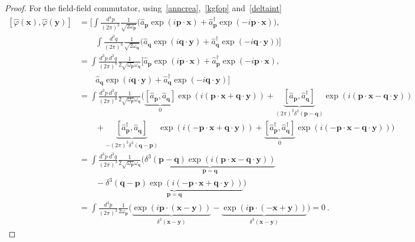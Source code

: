     \begin{proof}
        For the field-field commutator, using~\eqref{anncrea},~\eqref{kgfop} and~\eqref{deltaint}
        \begin{equation*}
        \begin{aligned}
            [\hat \varphi(\mathbf x), \hat \varphi (\mathbf y)] & = [\int \frac{d^3 p}{{(2\pi)}^3} \frac{1}{\sqrt{2 \omega_{\mathbf p}}} \Big (\hat a_{\mathbf p} \exp(i \mathbf p \cdot \mathbf x) + \hat a_{\mathbf p}^\dagger \exp(- i \mathbf p \cdot \mathbf x) \Big), \\ & \qquad \int \frac{d^3 q}{{(2\pi)}^3} \frac{1}{\sqrt{2 \omega_{\mathbf q}}} \Big (\hat a_{\mathbf q} \exp(i \mathbf q \cdot \mathbf y) + \hat a_{\mathbf q}^\dagger \exp(- i \mathbf q \cdot \mathbf y) \Big)] \\ &  = \int \frac{d^3 p ~ d^3 q}{{(2\pi)}^6} \frac{1}{2 \sqrt{\omega_{\mathbf p}} \omega_{\mathbf q}} [\hat a_{\mathbf p} \exp(i \mathbf p \cdot \mathbf x) + \hat a_{\mathbf p}^\dagger \exp(- i \mathbf p \cdot \mathbf x), \\ & \qquad \hat a_{\mathbf q} \exp(i \mathbf q \cdot \mathbf y) + \hat a_{\mathbf q}^\dagger \exp(- i \mathbf q \cdot \mathbf y)] \\ & = \int \frac{d^3 p ~ d^3 q}{{(2\pi)}^6} \frac{1}{2 \sqrt{\omega_{\mathbf p}} \omega_{\mathbf q}} \Big ( \underbrace{[\hat a_{\mathbf p}, \hat a_{\mathbf q}]}_0 \exp(i (\mathbf p \cdot \mathbf x + \mathbf q \cdot \mathbf y)) + \underbrace{[\hat a_{\mathbf p}, \hat a_{\mathbf q}^\dagger]}_{(2\pi)^3 \delta^3 (\mathbf p - \mathbf q)} \exp(i (\mathbf p \cdot \mathbf x - \mathbf q \cdot \mathbf y)) \\ & \qquad + \underbrace{[\hat a_{\mathbf p}^\dagger, \hat a_{\mathbf q}]}_{- (2\pi)^3 \delta^3 (\mathbf q - \mathbf p)} \exp(i (- \mathbf p \cdot \mathbf x + \mathbf q \cdot \mathbf y)) + \underbrace{[\hat a_{\mathbf p}^\dagger, \hat a_{\mathbf q}^\dagger]}_0 \exp(i (- \mathbf p \cdot \mathbf x - \mathbf q \cdot \mathbf y))\Big) \\ & = \int \frac{d^3 p ~ d^3 q}{{(2\pi)}^3} \frac{1}{2 \sqrt{\omega_{\mathbf p}} \omega_{\mathbf q}} \Big ( \underbrace{\delta^3 (\mathbf p - \mathbf q) \exp(i (\mathbf p \cdot \mathbf x - \mathbf q \cdot \mathbf y))}_{\mathbf p = \mathbf q} \\ & \qquad - \underbrace{\delta^3 (\mathbf q - \mathbf p) \exp(i (- \mathbf p \cdot \mathbf x + \mathbf q \cdot \mathbf y))}_{\mathbf p = \mathbf q} \Big) \\ & = \int \frac{d^3 p}{{(2\pi)}^3} \frac{1}{2 \omega_{\mathbf p}} \Big (\underbrace{\exp(i \mathbf p \cdot (\mathbf x - \mathbf y))}_{\delta^3 (\mathbf x - \mathbf y)} - \underbrace{\exp(i \mathbf p \cdot (- \mathbf x + \mathbf y))}_{\delta^3 (\mathbf x - \mathbf y)}\Big) = 0 ~.
        \end{aligned}
        \end{equation*}


\end{proof}
